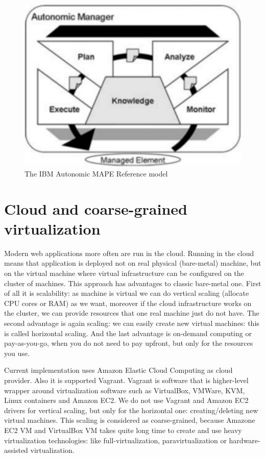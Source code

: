 \begin{figure}[h]
  \centering
    \includegraphics[natwidth=264,natheight=198]{./pictures/mape}
    \caption{The IBM Autonomic MAPE Reference model}
\end{figure}
  

\section{Cloud and coarse-grained virtualization}
Modern web applications more often are run in the cloud. Running in the cloud means that application is deployed not on real physical (bare-metal) machine, but on the virtual machine where virtual infrastructure can be configured on the cluster of machines. This approach has advantages to classic bare-metal one. First of all it is scalability: as machine is virtual we can do vertical scaling (allocate CPU cores or RAM) as we want, moreover if the cloud infrastructure works on the cluster, we can provide resources that one real machine just do not have. The second advantage is again scaling: we can easily create new virtual machines: this is called horizontal scaling. And the last advantage is on-demand computing or pay-as-you-go, when you do not need to pay upfront, but only for the resources you use.

\begin{sloppypar}
Current implementation uses Amazon Elastic Cloud Computing as cloud provider. Also it is supported Vagrant. Vagrant is software that is higher-level wrapper around virtualization software such as VirtualBox, VMWare, KVM, Linux containers and Amazon EC2. We do not use Vagrant and Amazon EC2 drivers for vertical scaling, but only for the horizontal one: creating/deleting new virtual machines. This scaling is considered as coarse-grained, because Amazone EC2 VM and VirtualBox VM takes quite long time to create and use heavy virtualization technologies: like full-virtualization, paravirtualization or hardware-assisted virtualization.
\end{sloppypar}

